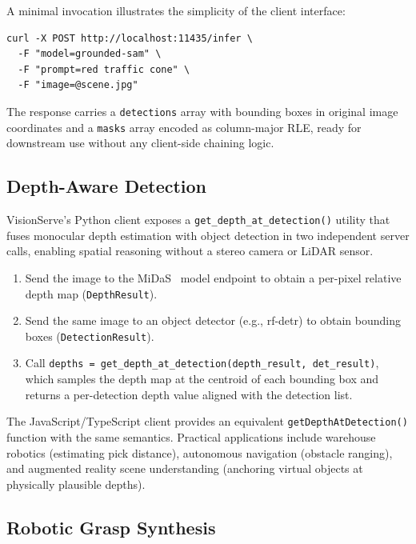 A minimal invocation illustrates the simplicity of the client interface:

{\footnotesize\begin{verbatim}
curl -X POST http://localhost:11435/infer \
  -F "model=grounded-sam" \
  -F "prompt=red traffic cone" \
  -F "image=@scene.jpg"
\end{verbatim}}

The response carries a \texttt{detections} array with bounding boxes in original image
coordinates and a \texttt{masks} array encoded as column-major RLE, ready for
downstream use without any client-side chaining logic.

\subsection{Depth-Aware Detection}
\label{subsec:depth-aware}

VisionServe's Python client exposes a \texttt{get\_depth\_at\_detection()} utility that
fuses monocular depth estimation with object detection in two independent server calls,
enabling spatial reasoning without a stereo camera or LiDAR sensor.

\begin{enumerate}
    \item Send the image to the MiDaS~\cite{ranftl2021midas} model endpoint to obtain a
          per-pixel relative depth map (\texttt{DepthResult}).
    \item Send the same image to an object detector (e.g., rf-detr) to obtain bounding
          boxes (\texttt{DetectionResult}).
    \item Call
          \texttt{depths = get\_depth\_at\_detection(\allowbreak depth\_result, det\_result)},
          which samples the depth map at the centroid of each bounding box and returns a
          per-detection depth value aligned with the detection list.
\end{enumerate}

The JavaScript/TypeScript client provides an equivalent \texttt{getDepthAtDetection()}
function with the same semantics. Practical applications include warehouse robotics
(estimating pick distance), autonomous navigation (obstacle ranging), and augmented
reality scene understanding (anchoring virtual objects at physically plausible depths).

\subsection{Robotic Grasp Synthesis}
\label{subsec:grasp}

